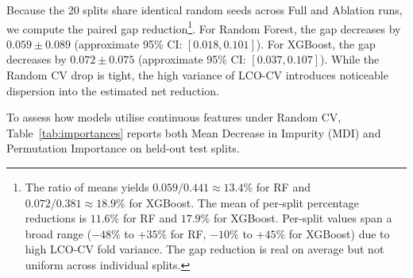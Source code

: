 \documentclass[conference]{IEEEtran}
\begin{document}
Because the 20 splits share identical random seeds across Full and Ablation runs, 
we compute the paired gap reduction\footnote{The ratio of means yields 
$0.059 / 0.441 \approx 13.4\%$ for RF and $0.072 / 0.381 \approx 18.9\%$ for XGBoost. 
The mean of per-split percentage reductions is $11.6\%$ for RF and $17.9\%$ for XGBoost. 
Per-split values span a broad range ($-48\%$ to $+35\%$ for RF, $-10\%$ to $+45\%$ 
for XGBoost) due to high LCO-CV fold variance. The gap reduction is real on average 
but not uniform across individual splits.}. For Random Forest, the gap decreases by 
$0.059 \pm 0.089$ (approximate 95\% CI: $[0.018, 0.101]$). For XGBoost, the gap 
decreases by $0.072 \pm 0.075$ (approximate 95\% CI: $[0.037, 0.107]$). 
While the Random CV drop is tight, the high variance of LCO-CV introduces 
noticeable dispersion into the estimated net reduction.

To assess how models utilise continuous features under Random CV, 
Table~\ref{tab:importances} reports both Mean Decrease in Impurity (MDI) 
and Permutation Importance on held-out test splits.

\begin{table}[t]
\centering
\caption{Feature Importance under Random CV (mean $\pm$ SD over splits)}
\label{tab:importances}
\end{table}
\end{document}
